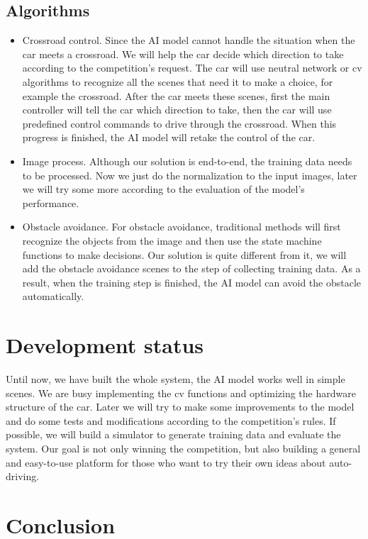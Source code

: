 \documentclass[conference]{IEEEtran}
\begin{document}
\subsection{Algorithms}
\begin{itemize}
\item Crossroad control. Since the AI model cannot handle the situation when the car meets a crossroad. We will help the car decide which direction to take according to the competition's request. The car will use neutral network or cv algorithms to recognize all the scenes that need it to make a choice, for example the crossroad. After the car meets these scenes, first the main controller will tell the car which direction to take, then the car will use predefined control commands to drive through the crossroad. When this progress is finished, the AI model will retake the control of the car.
\item Image process. Although our solution is end-to-end, the training data needs to be processed. Now we just do the normalization to the input images, later we will try some more according to the evaluation of the model's performance.
\item Obstacle avoidance. For obstacle avoidance, traditional methods will first recognize the objects from the image and then use the state machine functions to make decisions. Our solution is quite different from it, we will add the obstacle avoidance scenes to the step of collecting training data. As a result, when the training step is finished, the AI model can avoid the obstacle automatically.
\end{itemize}

\section{Development status}

Until now, we have built the whole system, the AI model works well in simple scenes. We are busy implementing the cv functions and optimizing the hardware structure of the car. Later we will try to make some improvements to the model and do some tests and modifications according to the competition's rules. If possible, we will build a simulator to generate training data and evaluate the system. Our goal is not only winning the competition, but also building a general and easy-to-use platform for those who want to try their own ideas about auto-driving.

\section{Conclusion}
\end{document}
